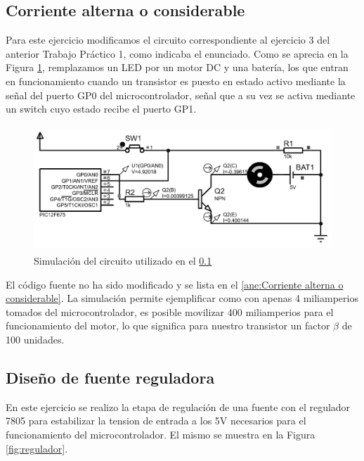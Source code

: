 \documentclass[a4paper]{article}
\newenvironment{ejercicios}
    {\setcounter{secnumdepth}{3}
    \renewcommand\thesubsection{Ejercicio \arabic{subsection}}}
    {\setcounter{secnumdepth}{0}}
\begin{document}
\begin{ejercicios}
    \subsection{Corriente alterna o considerable}\label{ej:Resistor}

    Para este ejercicio modificamos el circuito correspondiente al 
    ejercicio 3 del anterior Trabajo Práctico 1, como indicaba el 
    enunciado. Como se aprecia en la Figura \ref{fig:esquematico5},
    remplazamos un LED por un motor DC y una batería,
    los que entran en funcionamiento cuando un transistor es puesto en 
    estado activo mediante la señal del puerto GP0 del 
    microcontrolador, señal que a su vez se activa mediante un 
    switch cuyo estado recibe el puerto GP1.
    
    \begin{figure}[h]\centering
        \includegraphics[height=4.7cm]{esquematico5.png}
        \caption{Simulación del circuito utilizado en el  
        \ref{ej:Resistor}}\label{fig:esquematico5}
    \end{figure}

    El código fuente no ha sido modificado y se lista en el 
    \ref{ane:Corriente alterna o considerable}.
    La simulación permite ejemplificar como con apenas 4 miliamperios
    tomados del microcontrolador, es posible movilizar 400 
    miliamperios para el funcionamiento del motor, lo que significa
    para nuestro transistor un factor $\beta$ de 100 unidades.

    \subsection{Diseño de fuente reguladora}

    En este ejercicio se realizo la etapa de regulación de una fuente con el
    regulador 7805 para estabilizar la tension de entrada a los 5V necesarios para el 
    funcionamiento del microcontrolador. El mismo se muestra en la Figura 
    \ref{fig:regulador}.


\end{ejercicios}
\end{document}
